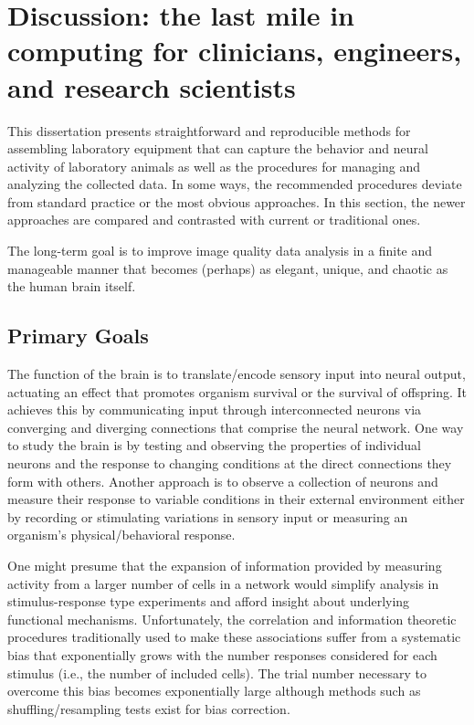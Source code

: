 \documentclass[../main.tex]{subfiles}
\begin{document}
\thispagestyle{myheadings}

\chapter{Discussion: the last mile in computing for clinicians, engineers, and research scientists}
\label{sec:discussion}


This dissertation presents straightforward and reproducible methods for assembling laboratory equipment that can capture the behavior and neural activity of laboratory animals as well as the procedures for managing and analyzing the collected data.
In some ways, the recommended procedures deviate from standard practice or the most obvious approaches.
In this section, the newer approaches are compared and contrasted with current or traditional ones.

The long-term goal is to improve image quality data analysis in a finite and manageable manner that becomes (perhaps) as elegant, unique, and chaotic as the human brain itself.

\section{Primary Goals}\label{sec:primary-goals}

The function of the brain is to translate/encode sensory input into neural output, actuating an effect that promotes organism survival or the survival of offspring.
It achieves this by communicating input through interconnected neurons via converging and diverging connections that comprise the neural network.
One way to study the brain is by testing and observing the properties of individual neurons and the response to changing conditions at the direct connections they form with others.
Another approach is to observe a collection of neurons and measure their response to variable conditions in their external environment either by recording or stimulating variations in sensory input or measuring an organism's physical/behavioral response.

One might presume that the expansion of information provided by measuring activity from a larger number of cells in a network would simplify analysis in stimulus-response type experiments and afford insight about underlying functional mechanisms.
Unfortunately, the correlation and information theoretic procedures traditionally used to make these associations suffer from a systematic bias that exponentially grows with the number responses considered for each stimulus (i.e., the number of included cells).
The trial number necessary to overcome this bias becomes exponentially large although methods such as shuffling/resampling tests exist for bias correction.
\end{document}
